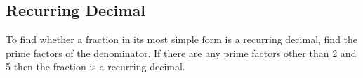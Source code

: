 \subsection{Recurring Decimal}

To find whether a fraction in its most simple form is a recurring decimal, find the prime factors of the denominator.
If there are any prime factors other than 2 and 5 then the fraction is a recurring decimal.
